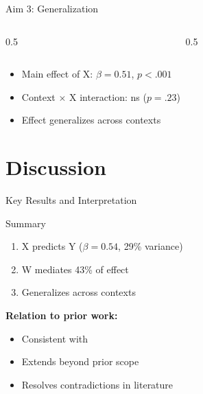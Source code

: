 \documentclass[aspectratio=169,11pt]{beamer}
\begin{document}
\begin{frame}{Aim 3: Generalization}
  \begin{columns}[T]
    \begin{column}{0.5\textwidth}
      \framebox[0.9\textwidth][c]{[Context 1]}
    \end{column}
    \begin{column}{0.5\textwidth}
      \framebox[0.9\textwidth][c]{[Context 2]}
    \end{column}
  \end{columns}
  \vspace{0.5cm}
  \begin{itemize}
    \item Main effect of X: $\beta = 0.51$, $p < .001$
    \item Context $\times$ X interaction: ns ($p = .23$)
    \item \alert{Effect generalizes across contexts}
  \end{itemize}
\end{frame}

\section{Discussion}

\begin{frame}{Key Results and Interpretation}
  \begin{exampleblock}{Summary}
    \begin{enumerate}
      \item X predicts Y ($\beta = 0.54$, 29\% variance)
      \item W mediates 43\% of effect
      \item Generalizes across contexts
    \end{enumerate}
  \end{exampleblock}
  \vspace{0.5cm}
  \textbf{Relation to prior work:}
  \begin{itemize}
    \item Consistent with \cite{jones2020}
    \item Extends beyond prior scope
    \item Resolves contradictions in literature
  \end{itemize}
\end{frame}
\end{document}
